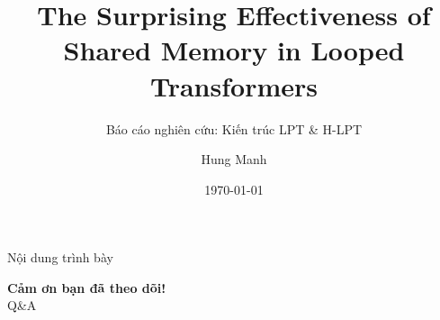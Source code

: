 \documentclass[aspectratio=169]{beamer}
\title[Looped Prediction Transformers]{The Surprising Effectiveness of Shared Memory in Looped Transformers}
\subtitle{Báo cáo nghiên cứu: Kiến trúc LPT \& H-LPT}
\author{Hung Manh}
\date{\today}
\begin{document}
\begin{frame}
    \titlepage
\end{frame}

\begin{frame}{Nội dung trình bày}
    \tableofcontents
\end{frame}



\begin{frame}
    \centering
    \Huge \textbf{Cảm ơn bạn đã theo dõi!}\\
    \vspace{0.5cm}
    \Large Q\&A
\end{frame}
\end{document}
